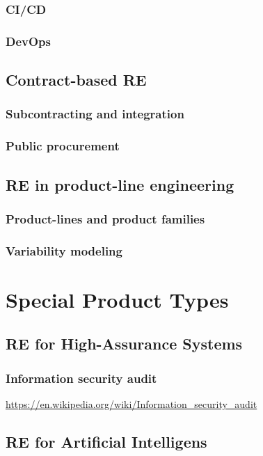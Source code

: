 \documentclass{reqengbook}
\begin{document}
\subsection{CI/CD}

\subsection{DevOps}

\section{Contract-based RE} 

\subsection{Subcontracting and integration}
\subsection{Public procurement}

\section{RE in product-line engineering}
\subsection{Product-lines and product families}
\subsection{Variability modeling}

\chapter{Special Product Types}

\section{RE for High-Assurance Systems}
\subsection{Information security audit}
\url{https://en.wikipedia.org/wiki/Information_security_audit}

\section{RE for Artificial Intelligens}
\end{document}

